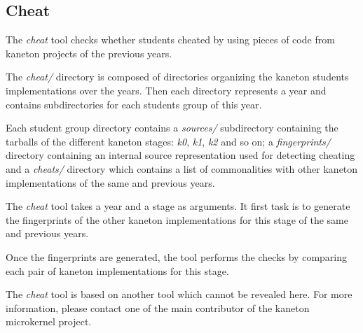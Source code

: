 %
%
%
%
%
%

%
%

\subsection{Cheat}

The \textit{cheat} tool checks whether students cheated by using pieces of
code from kaneton projects of the previous years.

The \textit{cheat/} directory is composed of directories organizing the
kaneton students implementations over the years. Then each directory
represents a year and contains subdirectories for each students group
of this year.

Each student group directory contains a \textit{sources/} subdirectory
containing the tarballs of the different kaneton stages: \textit{k0},
\textit{k1}, \textit{k2} and so on; a \textit{fingerprints/} directory
containing an internal source representation used for detecting cheating
and a \textit{cheats/} directory which contains a list of commonalities
with other kaneton implementations of the same and previous years.

The \textit{cheat} tool takes a year and a stage as arguments. It first
task is to generate the fingerprints of the other kaneton implementations
for this stage of the same and previous years.

Once the fingerprints are generated, the tool performs the checks by
comparing each pair of kaneton implementations for this stage.

The \textit{cheat} tool is based on another tool which cannot be revealed
here. For more information, please contact one of the main contributor of
the kaneton microkernel project.
